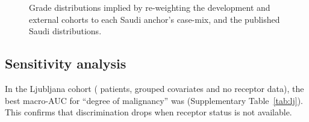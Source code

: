 \begin{figure}[htbp]\centering
{}
\caption{Grade distributions implied by re-weighting the development and external cohorts to each
Saudi anchor's case-mix, and the published Saudi distributions.}\label{fig:transport}
\end{figure}

\subsection{Sensitivity analysis}
In the Ljubljana cohort (\NLj{} patients, grouped covariates and no receptor data), the best
macro-AUC for ``degree of malignancy'' was \LjBest{} (Supplementary Table~\ref{tab:lj}). This
confirms that discrimination drops when receptor status is not available.
